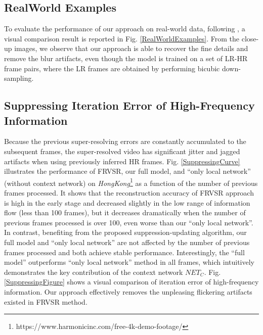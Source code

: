 \documentclass[letterpaper]{article} %
\begin{document}
\vspace{-0.72mm}
\subsection{RealWorld Examples}


To evaluate the performance of our approach on real-world data, following \cite{VESPCN2017cvpr}, a visual comparison result is reported in Fig. \ref{RealWorldExamples}. From the close-up images, we observe that our approach is able to recover the fine details and remove the blur artifacts, even though the model is trained on a set of LR-HR frame pairs, where the LR frames are obtained by performing bicubic down-sampling.



\vspace{-0.73mm}
\subsection{Suppressing Iteration Error of High-Frequency Information}

Because the previous super-resolving errors are constantly accumulated to the subsequent frames, the super-resolved video has significant jitter and jagged artifacts when using previously inferred HR frames. Fig. \ref{SuppressingCurve} illustrates the performance of FRVSR, our full model, and ``only local network'' (without context network) on \textit{HongKong}\footnote{https://www.harmonicinc.com/free-4k-demo-footage/} as a function of the number of previous frames processed. It shows that the reconstruction accuracy of FRVSR approach is high in the early stage and decreased slightly in the low range of information flow (less than 100 frames), but it decreases dramatically when the number of previous frames processed is over 100, even worse than our ``only local network''. In contrast, benefiting from the proposed suppression-updating algorithm, our full model and ``only local network'' are not affected by the number of previous frames processed and both achieve stable performance. Interestingly, the ``full model'' outperforms ``only local network'' method in all frames, which intuitively demonstrates the key contribution of the context network $NET_C$. Fig. \ref{SuppressingFigure} shows a visual comparison of iteration error of high-frequency information. Our approach effectively removes the unpleasing flickering artifacts existed in FRVSR method.



\vspace{-0.89mm}
\vspace{-1.73mm}
\end{document}
